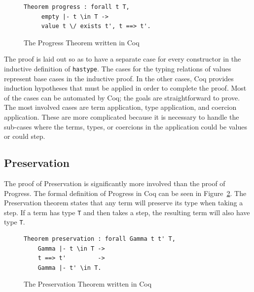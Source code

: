 \documentclass{sig-alternate}
\begin{document}
\begin{figure}[h!]
\begin{lstlisting}
Theorem progress : forall t T, 
     empty |- t \in T ->
     value t \/ exists t', t ==> t'.
\end{lstlisting}
\caption{The Progress Theorem written in Coq}
\label{fig:progress-coq}
\end{figure}

The proof is laid out so as to have a separate case for every constructor in the inductive definition of \texttt{has\textunderscore type}. The cases for the typing relations of values represent base cases in the inductive proof. In the other cases, Coq provides induction hypotheses that must be applied in order to complete the proof. Most of the cases can be automated by Coq; the goals are straightforward to prove. The most involved cases are term application, type application, and coercion application. These are more complicated because it is necessary to handle the sub-cases where the terms, types, or coercions in the application could be values or could step.

\subsection{Preservation}
\label{sec:implementation-preservation}

The proof of Preservation is significantly more involved than the proof of Progress. The formal definition of Progress in Coq can be seen in Figure~\ref{fig:preservation-coq}. The Preservation theorem states that any term will preserve its type when taking a step. If a term has type \texttt{T} and then takes a step, the resulting term will also have type \texttt{T}. 

\begin{figure}[h!]
\begin{lstlisting}
Theorem preservation : forall Gamma t t' T, 
    Gamma |- t \in T ->
    t ==> t'         ->
    Gamma |- t' \in T.
\end{lstlisting}
\caption{The Preservation Theorem written in Coq}
\label{fig:preservation-coq}
\end{figure}
\end{document}
